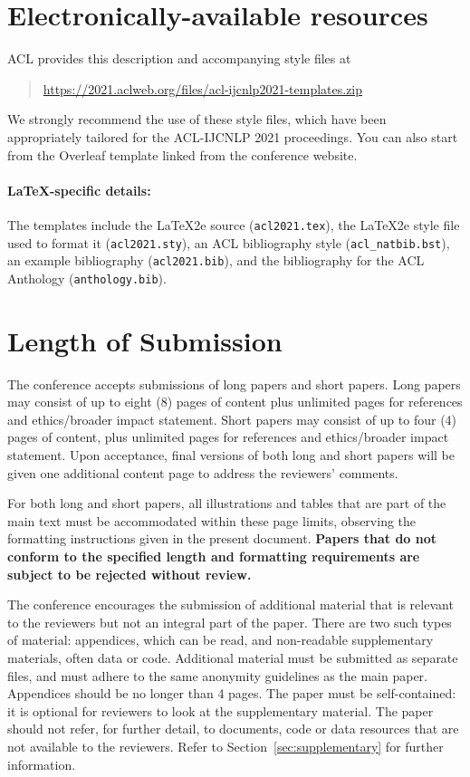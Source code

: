 \documentclass[11pt,a4paper]{article}
\begin{document}
	
	\section{Electronically-available resources}
	
	ACL provides this description and accompanying style files at
	\begin{quote}
		\url{https://2021.aclweb.org/files/acl-ijcnlp2021-templates.zip}
	\end{quote}
	We strongly recommend the use of these style files, which have been appropriately tailored for the ACL-IJCNLP 2021 proceedings. You can also start from the Overleaf template linked from the conference website.
	
	\paragraph{\LaTeX-specific details:}
	The templates include the \LaTeX2e{} source (\texttt{\small acl2021.tex}),
	the \LaTeX2e{} style file used to format it (\texttt{\small acl2021.sty}),
	an ACL bibliography style (\texttt{\small acl\_natbib.bst}),
	an example bibliography (\texttt{\small acl2021.bib}),
	and the bibliography for the ACL Anthology (\texttt{\small anthology.bib}).
	
	
	\section{Length of Submission}
	\label{sec:length}
	
	The conference accepts submissions of long papers and short papers. Long papers may consist of up to eight (8) pages of content plus unlimited pages for references and ethics/broader impact statement. Short papers may consist of up to four (4) pages of content, plus unlimited pages for references and ethics/broader impact statement. Upon acceptance, final versions of both long and short papers will be given one additional content page to address the reviewers' comments.
	
	For both long and short papers, all illustrations and tables that are part of the main text must be accommodated within these page limits, observing the formatting instructions given in the present document. 
	\textbf{Papers that do not conform to the specified length and formatting requirements are subject to be rejected without review.}
	
	The conference encourages the submission of additional material that is relevant to the reviewers but not an integral part of the paper.
	There are two such types of material: appendices, which can be read, and non-readable supplementary materials, often data or code. 
	Additional material must be submitted as separate files, and must adhere to the same anonymity guidelines as the main paper. Appendices should be no longer than 4 pages.
	The paper must be self-contained: it is optional for reviewers to look at the supplementary material.
	The paper should not refer, for further detail, to documents, code or data resources that are not available to the reviewers.
	Refer to Section~\ref{sec:supplementary} for further information. 
	
\end{document}
